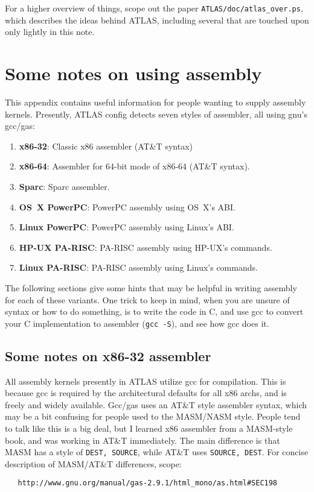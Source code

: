 \documentclass[11pt]{article}
\begin{document}
For a higher overview of things, scope out the paper
{\tt ATLAS/doc/atlas\_over.ps}, which describes
the ideas behind ATLAS, including several that are touched upon
only lightly in this note.

\newpage
\appendix
\section{Some notes on using assembly}
This
appendix contains useful information for people wanting to supply assembly
kernels.  Presently, ATLAS config detects seven styles of assembler, all
using gnu's gcc/gas:
\begin{enumerate}
\item {\bf x86-32}: Classic x86 assembler (AT\&T syntax)
\item {\bf x86-64}: Assembler for 64-bit mode of x86-64 (AT\&T syntax).
\item {\bf Sparc}:  Sparc assembler.
\item {\bf OS~X PowerPC}:  PowerPC assembly using OS~X's ABI.
\item {\bf Linux PowerPC}:  PowerPC assembly using Linux's ABI.
\item {\bf HP-UX PA-RISC}:  PA-RISC assembly using HP-UX's commands.
\item {\bf Linux PA-RISC}:  PA-RISC assembly using Linux's commands.
\end{enumerate}

The following sections give some hints that may be helpful in writing
assembly for each of these variants.  One trick to keep in mind, when
you are unsure of syntax or how to do something, is to write the code
in C, and use gcc to convert your C implementation to assembler 
({\tt gcc -S}), and see how gcc does it.

\subsection{Some notes on x86-32 assembler}

All assembly kernels presently in ATLAS utilize gcc for compilation.  This
is because gcc is required by the architectural defaults for all x86 archs,
and is freely and widely available.  Gcc/gas uses an AT\&T style assembler
syntax, which may be a bit confusing for people used to the MASM/NASM style.
People tend to talk like this is a big deal, but I learned x86 assembler from
a MASM-style book, and was working in AT\&T immediately.  The main difference
is that MASM has a style of {\tt DEST, SOURCE}, while AT\&T uses 
{\tt SOURCE, DEST}.  For concise description of MASM/AT\&T differences, scope:
\begin{verbatim}
   http://www.gnu.org/manual/gas-2.9.1/html_mono/as.html#SEC198
\end{verbatim}
\end{document}
